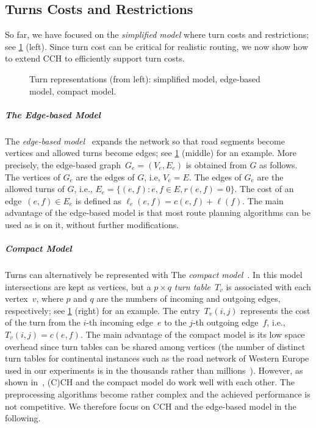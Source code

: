 \documentclass[a4paper, english, cleveref]{lipics-v2021}
\begin{document}
\subsection{Turns Costs and Restrictions}

So far, we have focused on the \emph{simplified model} where turn costs and restrictions; see \cref{fig:turn-representation} (left).
Since turn cost can be critical for realistic routing, we now show how to extend CCH to efficiently support turn costs.

\begin{figure}[tb]
  \hfill
  \hfill
  \hfill
  \hfill\hspace{0pt}
  \caption{Turn representations (from left): simplified model, edge-based model, compact model.}
  \label{fig:turn-representation}
\end{figure}

\subparagraph{The Edge-based Model}

The \emph{edge-based model}~\cite{Caldwell61, Winter02} expands the network so that road segments become vertices and allowed turns become edges; see \cref{fig:turn-representation} (middle) for an example.
More precisely, the edge-based graph~$G_e = (V_e, E_e)$ is obtained from $G$ as follows.
The vertices of $G_e$ are the edges of $G$, i.e, $V_e = E$.
The edges of $G_e$ are the allowed turns of $G$, i.e., $E_e = \{(e, f): e, f \in E, r(e, f) = 0\}$.
The cost of an edge~$(e, f) \in E_e$ is defined as $\ell_e(e, f) = c(e, f) + \ell(f)$.
The main advantage of the edge-based model is that most route planning algorithms can be used as is on it, without further modifications.

\subparagraph{Compact Model}

Turns can alternatively be represented with The \emph{compact model}~\cite{GeisbergerV11, DellingGPW17}.
In this model intersections are kept as vertices, but a $p \times q$ \emph{turn table}~$T_v$ is associated with each vertex~$v$, where $p$ and $q$ are the numbers of incoming and outgoing edges, respectively; see \cref{fig:turn-representation} (right) for an example.
The entry~$T_v(i, j)$ represents the cost of the turn from the $i$-th incoming edge~$e$ to the $j$-th outgoing edge~$f$, i.e., $T_v(i, j) = c(e, f)$.
The main advantage of the compact model is its low space overhead since turn tables can be shared among vertices (the number of distinct turn tables for continental instances such as the road network of Western Europe used in our experiments is in the thousands rather than millions~\cite{DellingGPW17}).
However, as shown in~\cite{GeisbergerV11, TODO}, (C)CH and the compact model do work well with each other.
The preprocessing algorithms become rather complex and the achieved performance is not competitive.
We therefore focus on CCH and the edge-based model in the following.
\end{document}
